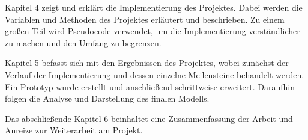 Kapitel 4 zeigt und erklärt die Implementierung des Projektes. Dabei werden die Variablen und Methoden des Projektes erläutert und beschrieben. Zu einem großen Teil wird Pseudocode verwendet, um die Implementierung verständlicher zu machen und den Umfang zu begrenzen.

Kapitel 5 befasst sich mit den Ergebnissen des Projektes, wobei zunächst der Verlauf der Implementierung und dessen einzelne Meilensteine behandelt werden. Ein Prototyp wurde erstellt und anschließend schrittweise erweitert. Daraufhin folgen die Analyse und Darstellung des finalen Modells.

Das abschließende Kapitel 6 beinhaltet eine Zusammenfassung der Arbeit und Anreize zur Weiterarbeit am Projekt.